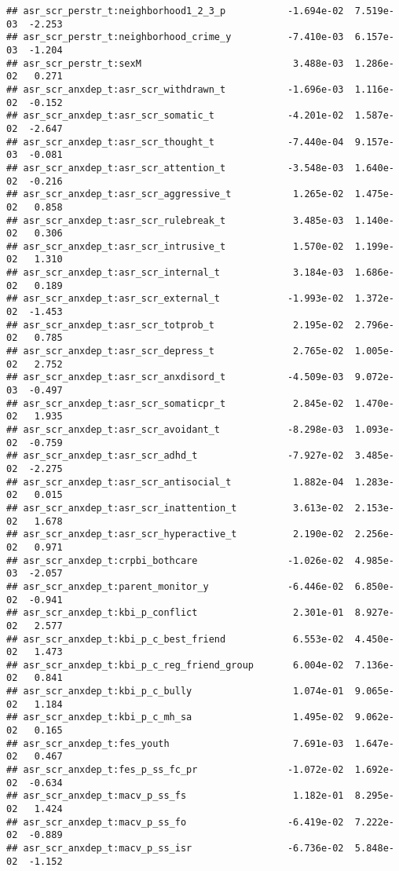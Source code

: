 \documentclass[
]{article}
\begin{document}
\begin{verbatim}
## asr_scr_perstr_t:neighborhood1_2_3_p           -1.694e-02  7.519e-03  -2.253
## asr_scr_perstr_t:neighborhood_crime_y          -7.410e-03  6.157e-03  -1.204
## asr_scr_perstr_t:sexM                           3.488e-03  1.286e-02   0.271
## asr_scr_anxdep_t:asr_scr_withdrawn_t           -1.696e-03  1.116e-02  -0.152
## asr_scr_anxdep_t:asr_scr_somatic_t             -4.201e-02  1.587e-02  -2.647
## asr_scr_anxdep_t:asr_scr_thought_t             -7.440e-04  9.157e-03  -0.081
## asr_scr_anxdep_t:asr_scr_attention_t           -3.548e-03  1.640e-02  -0.216
## asr_scr_anxdep_t:asr_scr_aggressive_t           1.265e-02  1.475e-02   0.858
## asr_scr_anxdep_t:asr_scr_rulebreak_t            3.485e-03  1.140e-02   0.306
## asr_scr_anxdep_t:asr_scr_intrusive_t            1.570e-02  1.199e-02   1.310
## asr_scr_anxdep_t:asr_scr_internal_t             3.184e-03  1.686e-02   0.189
## asr_scr_anxdep_t:asr_scr_external_t            -1.993e-02  1.372e-02  -1.453
## asr_scr_anxdep_t:asr_scr_totprob_t              2.195e-02  2.796e-02   0.785
## asr_scr_anxdep_t:asr_scr_depress_t              2.765e-02  1.005e-02   2.752
## asr_scr_anxdep_t:asr_scr_anxdisord_t           -4.509e-03  9.072e-03  -0.497
## asr_scr_anxdep_t:asr_scr_somaticpr_t            2.845e-02  1.470e-02   1.935
## asr_scr_anxdep_t:asr_scr_avoidant_t            -8.298e-03  1.093e-02  -0.759
## asr_scr_anxdep_t:asr_scr_adhd_t                -7.927e-02  3.485e-02  -2.275
## asr_scr_anxdep_t:asr_scr_antisocial_t           1.882e-04  1.283e-02   0.015
## asr_scr_anxdep_t:asr_scr_inattention_t          3.613e-02  2.153e-02   1.678
## asr_scr_anxdep_t:asr_scr_hyperactive_t          2.190e-02  2.256e-02   0.971
## asr_scr_anxdep_t:crpbi_bothcare                -1.026e-02  4.985e-03  -2.057
## asr_scr_anxdep_t:parent_monitor_y              -6.446e-02  6.850e-02  -0.941
## asr_scr_anxdep_t:kbi_p_conflict                 2.301e-01  8.927e-02   2.577
## asr_scr_anxdep_t:kbi_p_c_best_friend            6.553e-02  4.450e-02   1.473
## asr_scr_anxdep_t:kbi_p_c_reg_friend_group       6.004e-02  7.136e-02   0.841
## asr_scr_anxdep_t:kbi_p_c_bully                  1.074e-01  9.065e-02   1.184
## asr_scr_anxdep_t:kbi_p_c_mh_sa                  1.495e-02  9.062e-02   0.165
## asr_scr_anxdep_t:fes_youth                      7.691e-03  1.647e-02   0.467
## asr_scr_anxdep_t:fes_p_ss_fc_pr                -1.072e-02  1.692e-02  -0.634
## asr_scr_anxdep_t:macv_p_ss_fs                   1.182e-01  8.295e-02   1.424
## asr_scr_anxdep_t:macv_p_ss_fo                  -6.419e-02  7.222e-02  -0.889
## asr_scr_anxdep_t:macv_p_ss_isr                 -6.736e-02  5.848e-02  -1.152

\end{verbatim}
\end{document}
